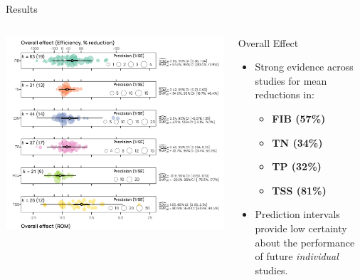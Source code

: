 \documentclass[
  ignorenonframetext,
  aspectratio=169,
]{beamer}
\providecommand{\tightlist}{%
  \setlength{\itemsep}{0pt}\setlength{\parskip}{0pt}}\usepackage{longtable,booktabs,array}
\begin{document}
\begin{frame}{Results}
\label{results}
\begin{columns}[T]
\begin{column}{0.6\textwidth}
\includegraphics[width=1\textwidth,height=\textheight]{Schramm-UCOWR-2024_files/figure-beamer/p4-1.png}
\end{column}

\begin{column}{0.4\textwidth}
\begin{block}{Overall Effect}
\label{overall-effect}
\begin{itemize}
\tightlist
\item
  Strong evidence across studies for mean reductions in:

  \begin{itemize}
  \tightlist
  \item
    \textbf{FIB (57\%)}
  \item
    \textbf{TN (34\%)}
  \item
    \textbf{TP (32\%)}
  \item
    \textbf{TSS (81\%)}
  \end{itemize}
\item
  Prediction intervals provide low certainty about the performance of
  future \emph{individual} studies.
\end{itemize}
\end{block}
\end{column}
\end{columns}
\end{frame}
\end{document}
